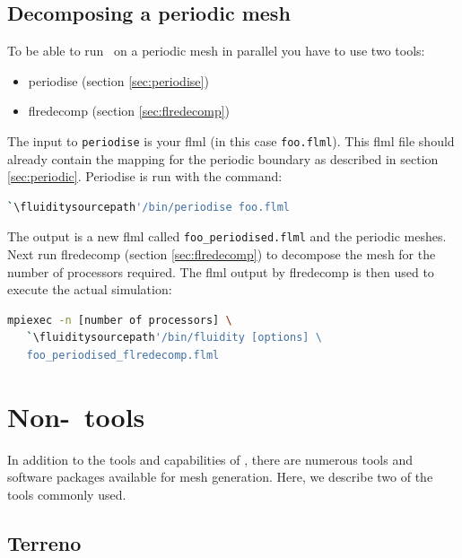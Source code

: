 \subsection{Decomposing a periodic mesh}
\label{sec:decomposing_meshes_periodise}

To be able to run \fluidity\ on a periodic mesh in parallel you have to use
two tools:

\begin{itemize}
\item periodise (section \ref{sec:periodise})
\item flredecomp (section \ref{sec:flredecomp})
\end{itemize}

The input to \lstinline+periodise+ is your flml (in this case
\lstinline{foo.flml}). This flml file should already contain the mapping for
the periodic boundary as described in section
\ref{sec:periodic}. Periodise is run with the command:

\begin{lstlisting}[language=bash]
`\fluiditysourcepath'/bin/periodise foo.flml
\end{lstlisting}

The output is a new flml called \lstinline+foo_periodised.flml+ and the
periodic meshes. Next run flredecomp (section \ref{sec:flredecomp}) to decompose the mesh for the number of processors
required. The flml output by flredecomp is then used to execute the actual simulation:

\begin{lstlisting}[language=bash]
mpiexec -n [number of processors] \
   `\fluiditysourcepath'/bin/fluidity [options] \
   foo_periodised_flredecomp.flml
\end{lstlisting}

\section{Non-\fluidity\ tools}

In addition to the tools and capabilities of \fluidity, there are numerous
tools and software packages available for mesh generation. Here, we describe 
two of the tools commonly used.

\subsection{Terreno}
\label{sec:Terreno}

